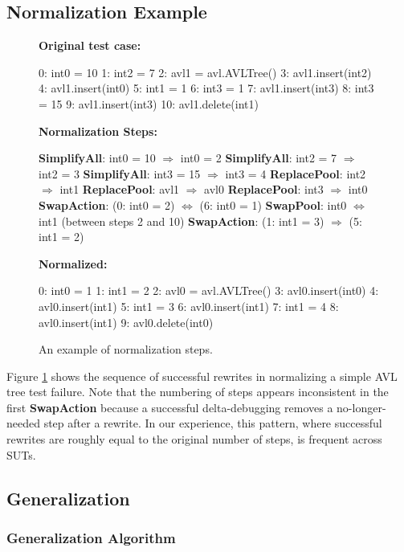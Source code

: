 \subsection{Normalization Example}
\label{formalexample}

\begin{figure}
{\scriptsize
{\bf Original test case:}
\begin{code}
  0: int0 = 10 
  1: int2 = 7 
  2: avl1 = avl.AVLTree() 
  3: avl1.insert(int2) 
  4: avl1.insert(int0) 
  5: int1 = 1 
  6: int3 = 1 
  7: avl1.insert(int3) 
  8: int3 = 15 
  9: avl1.insert(int3) 
 10: avl1.delete(int1) 
\end{code}
{\bf Normalization Steps:}
\begin{code}
{\bf SimplifyAll}: int0 = 10 $\Rightarrow$ int0 = 2 
{\bf SimplifyAll}: int2 = 7  $\Rightarrow$ int2 = 3 
{\bf SimplifyAll}: int3 = 15  $\Rightarrow$ int3 = 4 
{\bf ReplacePool}: int2 $\Rightarrow$ int1
{\bf ReplacePool}: avl1 $\Rightarrow$ avl0
{\bf ReplacePool}: int3 $\Rightarrow$ int0
{\bf SwapAction}: (0: int0 = 2)  $\Leftrightarrow$ (6: int0 = 1)
{\bf SwapPool}: int0 $\Leftrightarrow$ int1 (between steps 2 and 10)
{\bf SwapAction}: (1: int1 = 3)  $\Rightarrow$ (5: int1 = 2)
\end{code}
{\bf Normalized:}
\begin{code}
  0: int0 = 1
  1: int1 = 2
  2: avl0 = avl.AVLTree()
  3: avl0.insert(int0) 
  4: avl0.insert(int1) 
  5: int1 = 3  
  6: avl0.insert(int1) 
  7: int1 = 4  
  8: avl0.insert(int1)  
  9: avl0.delete(int0) 
\end{code}
}
\caption{An example of normalization steps.}
\label{diffnorm}
\end{figure}

Figure \ref{diffnorm} shows the sequence of successful rewrites in
normalizing a simple AVL tree test failure.  Note that the numbering
of steps appears inconsistent in the first {\bf SwapAction} because a
successful delta-debugging removes a no-longer-needed step after a
rewrite.  In our experience, this pattern, where successful rewrites
are roughly equal to the original number of steps, is frequent across SUTs.

\subsection{Generalization}

\subsubsection{Generalization Algorithm}

